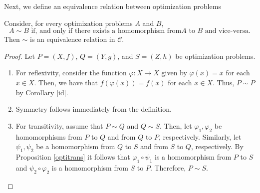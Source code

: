 \documentclass[a4paper]{article}
\begin{document}
Next, we define an equivalence relation between optimization problems


\begin{lemma}
Consider, for every optimization problems $A$ and $B$, $$A\sim B \text{ if, and
  only if  there exists a homomorphism from} A \text{ to } B \text{ and vice-versa.}$$
Then $\sim$ is an equivalence relation in \(\mathcal{C}\).
\end{lemma}

\begin{proof}

  Let $P=(X,f)$, $Q=(Y,g)$, and $S=(Z,h)$ be optimization problems.
\begin{enumerate}[label=(\roman*)]

\item For reflexivity, consider the function \mbox{$\varphi\colon X\to X$} given by
  $\varphi(x)=x$ for each $x\in X$. Then, we have that $f(\varphi(x))=f(x)$ for each
  $x\in X$. Thus, $P\sim P$ by Corollary \ref{id}.
  
\item Symmetry follows immediately from the definition.

\item For transitivity, assume that $P\sim Q$ and $Q\sim S$. Then, let
  $\varphi_1,\varphi_2$ be homomorphisms from $P$ to $Q$ and from $Q$ to $P$,
  respectively. Similarly, let $\psi_1,\psi_2$ be a homomorphism from $Q$ to $S$
  and from $S$ to $Q$, respectively. By Proposition \ref{optitrans} it follows
  that $\varphi_1\circ\psi_1$ is a homomorphism from $P$ to $S$ and
  $\psi_2\circ\varphi_2$ is a homomorphism from $S$ to $P$. Therefore, $P\sim
  S$.\qedhere
  \end{enumerate}

\end{proof}
\end{document}
